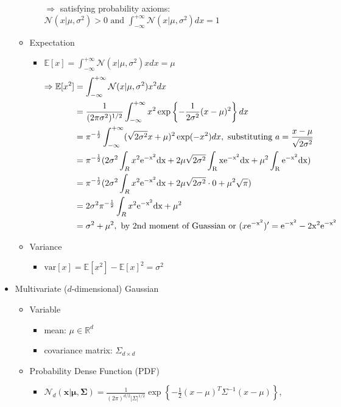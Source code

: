\begin{itemize}
\begin{itemize}
\begin{itemize}
		$\Rightarrow$ satisfying probability axioms: $\displaystyle \mathcal N(x|\mu,\sigma^2)>0 \text{ and } \int_{-\infty}^{+\infty} \mathcal N (x|\mu,\sigma^2) dx = 1$
		\end{itemize}
	\item Expectation
		\begin{itemize}
		\item $\displaystyle \mathbb{E}[x] = \int_{-\infty}^{+\infty}\mathcal{N}(x|\mu, \sigma^2)xdx=\mu$
		\begin{align*}
		\Rightarrow \displaystyle \mathbb E [x^2] &= \int_{-\infty}^{+\infty} \mathcal{N}(x|\mu, \sigma^2)x^2dx \\ 
		&= \frac 1 {(2\pi \sigma^2)^{1/2}} \int_{-\infty}^{+\infty} x^2 \exp \left\{ -\frac 1 {2\sigma^2}(x-\mu)^2 \right\} dx \\ 
		&= \pi^{-\frac 12} \int_{-\infty}^{+\infty} (\sqrt{2\sigma^2}x+\mu)^2 \exp(-x^2) dx, \text{ substituting } a=\frac{x-\mu}{\sqrt{2\sigma^2}} \\ 
		&= \pi^{-\frac 12} (2\sigma^2\int_R x^2\rm{e}^{-x^2}dx + 2\mu\sqrt{2\sigma^2}\int_R x\rm{e}^{-x^2}dx + \mu^2 \int_R \rm{e}^{-x^2}dx ) \\ 
		&= \pi^{-\frac 12} ( 2\sigma^2\int_R x^2\rm{e}^{-x^2}dx + 2\mu\sqrt{2\sigma^2}\cdot 0 + \mu^2\sqrt\pi ) \\ 
		&= 2\sigma^2\pi^{-\frac 12}\int_R x^2\rm{e}^{-x^2}dx + \mu^2 \\ 
		&= \sigma^2 + \mu^2, \text{ by 2nd moment of Guassian or } (x\rm e^{-x^2})' = e^{-x^2}-2x^2\rm e^{-x^2}
		\end{align*}
		\end{itemize}
	\item Variance
		\begin{itemize}
		\item $\displaystyle \text{var}[x] = \mathbb E[x^2] - \mathbb E[x]^2 = \sigma^2$
		\end{itemize}
	\end{itemize}
\item Multivariate ($d$-dimensional) Gaussian
	\begin{itemize}
	\item Variable
		\begin{itemize}
		\item mean: $\mu \in \mathbb R^d$
		\item covariance matrix: $\Sigma_{d\times d}$
		\end{itemize}
	\item Probability Dense Function (PDF)
		\begin{itemize}
		\item $\displaystyle \mathcal N_d(\mathbf x|\mathbf{\mu},\mathbf \Sigma) = \frac 1 {(2\pi)^{d/2} |\Sigma|^{1/2}} \exp \left\{ -\frac 1 2 (x-\mu)^T \Sigma^{-1} (x-\mu) \right\} $,
		

\end{itemize}
\end{itemize}
\end{itemize}
